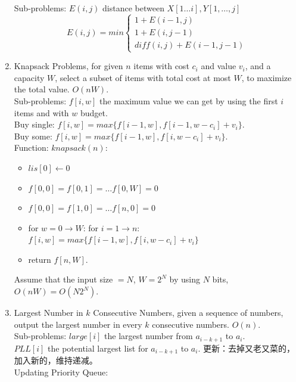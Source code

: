 \documentclass[10pt, a4paper, twocolumn]{article}
\begin{document}
\begin{enumerate}[leftmargin = 12pt, topsep = 0pt, itemsep=0pt, partopsep = 0pt]
        Sub-problems: $E(i,j)$ distance between $X[1\dots i], Y[1,\dots, j]$\\
        \begin{equation}
        	E(i,j) = min \begin{cases}
        	1+E(i-1,j)\\
        	1+E(i,j-1)\\
        	diff(i,j)+E(i-1,j-1)
        	\end{cases}
        \nonumber 
        \end{equation}
    \item Knapsack Problems, for given $n$ items with cost $c_i$ and     value $v_i$, and a capacity $W$, select a subset of items        with total cost at most $W$, to maximize the total value.        $O(nW)$.\\
        Sub-problems: $f[i,w]$ the maximum value we can get by using the first $i$ items and with $w$ budget.\\
        Buy single: $f[i,w] = max\{ f[i-1,w], f[i-1,w-c_i]+v_i\}$.\\
        Buy some: $f[i,w] = max\{ f[i-1,w], f[i,w-c_i]+v_i\}$.\\
        Function: $knapsack(n)$:
        \begin{itemize}[leftmargin = 12pt, topsep = 0pt, itemsep=0pt, partopsep = 0pt]
        \item $lis[0]\leftarrow 0$
        \item $f[0,0]=f[0,1]=\dots f[0,W]=0$
        \item $f[0,0]=f[1,0]=\dots f[n,0]=0$
        \item for $w=0\to W$: for $i=1\to n$: \\
        $f[i,w] = max\{ f[i-1,w], f[i,w-c_i]+v_i\}$
        \item return $f[n,W]$.
        \end{itemize}
        Assume that the input size $=N$, $W=2^N$ by using $N$ bits, $O(nW)=O(N2^N)$.
    \item Largest Number in $k$ Consecutive Numbers, given a sequence     of numbers, output the largest number in every $k$               consecutive numbers. $O(n)$.\\
        Sub-problems: $large[i]$ the largest number from $a_{i-k+1}$ to $a_i$.\\
        $PLL[i]$ the potential largest list for $a_{i-k+1}$ to $a_i$. 更新：去掉又老又菜的，加入新的，维持递减。\\
        Updating Priority Queue: \\

\end{enumerate}
\end{document}

